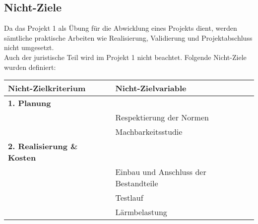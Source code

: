 \subsection{Nicht-Ziele}
Da das Projekt 1 als Übung für die Abwicklung eines Projekts dient, werden sämtliche praktische Arbeiten wie Realisierung, Validierung und Projektabschluss nicht umgesetzt.\\
Auch der juristische Teil wird im Projekt 1 nicht beachtet.
Folgende Nicht-Ziele wurden definiert:
\begin{table}[H]
\begin{tabular}{ll}
\textbf{Nicht-Zielkriterium}				&\textbf{Nicht-Zielvariable}											\\
\hline
\rowcolor{grau}
\textbf{1. Planung}						&																	\\
										&Respektierung der Normen											\\
										&Machbarkeitsstudie													\\
\rowcolor{grau}
\textbf{2. Realisierung \& Kosten}		&																	\\
										&Einbau und Anschluss der Bestandteile\\
										&Testlauf															\\
										&Lärmbelastung														\\		
\hline
\end{tabular}
\end{table}
